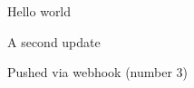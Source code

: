 \documentclass{article}
\begin{document}
Hello world

A second update

Pushed via webhook (number 3)
\end{document}

